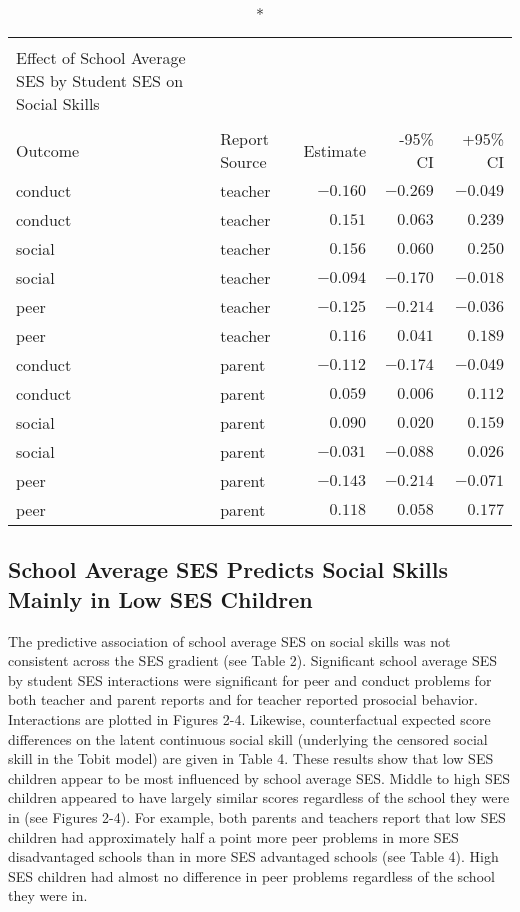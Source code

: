 \documentclass[
  english,
  man]{apa6}
\begin{document}
\captionsetup[table]{labelformat=empty,skip=1pt}
\begin{longtable}{llrrr}
\caption*{
\large Table 2\\ 
\small Effect of School Average SES by Student SES on Social Skills\\ 
} \\ 
\toprule
Outcome & Report Source & Estimate & -95\% CI & +95\% CI \\ 
\midrule
conduct & teacher & $-0.160$ & $-0.269$ & $-0.049$ \\ 
conduct & teacher & $0.151$ & $0.063$ & $0.239$ \\ 
social & teacher & $0.156$ & $0.060$ & $0.250$ \\ 
social & teacher & $-0.094$ & $-0.170$ & $-0.018$ \\ 
peer & teacher & $-0.125$ & $-0.214$ & $-0.036$ \\ 
peer & teacher & $0.116$ & $0.041$ & $0.189$ \\ 
conduct & parent & $-0.112$ & $-0.174$ & $-0.049$ \\ 
conduct & parent & $0.059$ & $0.006$ & $0.112$ \\ 
social & parent & $0.090$ & $0.020$ & $0.159$ \\ 
social & parent & $-0.031$ & $-0.088$ & $0.026$ \\ 
peer & parent & $-0.143$ & $-0.214$ & $-0.071$ \\ 
peer & parent & $0.118$ & $0.058$ & $0.177$ \\ 
\bottomrule
\end{longtable}

\hypertarget{school-average-ses-predicts-social-skills-mainly-in-low-ses-children}{%
\subsection{School Average SES Predicts Social Skills Mainly in Low SES Children}\label{school-average-ses-predicts-social-skills-mainly-in-low-ses-children}}

The predictive association of school average SES on social skills was not consistent across the SES gradient (see Table 2). Significant school average SES by student SES interactions were significant for peer and conduct problems for both teacher and parent reports and for teacher reported prosocial behavior. Interactions are plotted in Figures 2-4. Likewise, counterfactual expected score differences on the latent continuous social skill (underlying the censored social skill in the Tobit model) are given in Table 4. These results show that low SES children appear to be most influenced by school average SES. Middle to high SES children appeared to have largely similar scores regardless of the school they were in (see Figures 2-4). For example, both parents and teachers report that low SES children had approximately half a point more peer problems in more SES disadvantaged schools than in more SES advantaged schools (see Table 4). High SES children had almost no difference in peer problems regardless of the school they were in.
\end{document}
